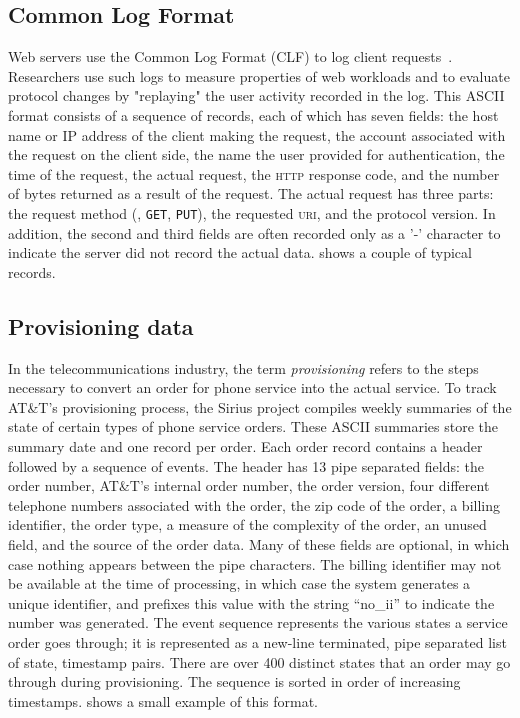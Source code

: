 \documentclass{sig-alternate}
\newcommand{\dibbler}{Sirius}
\begin{document}
\subsection{Common Log Format}
Web servers use the Common Log Format (CLF) to log client
requests~\cite{wpp}.  Researchers use such logs to measure
properties of web workloads and to evaluate protocol changes
by "replaying" the user activity recorded in the log.
This ASCII format consists of a sequence of
records, each of which has seven fields: the host name or IP address
of the client making the request, the account associated with the
request on the client side, the name the user provided for
authentication, the time of the request, the actual request, the
\textsc{http} response code, and the number of bytes returned as a
result of the request.  The actual request has three parts: the
request method (\eg, \texttt{GET}, \texttt{PUT}), the requested
\textsc{uri}, and the protocol version.  In addition, the second and
third fields are often recorded only as a '-' character to indicate
the server did not record the actual data.  
shows a couple of typical records.


\subsection{Provisioning data}
In the telecommunications industry, the term \textit{provisioning} refers to the steps necessary to convert an order for phone service into the actual 
service.  
To track AT\&T's provisioning process, the \dibbler{} project compiles
weekly summaries of the state of certain types of phone service orders.  
These ASCII summaries store the summary date and one record per order.
Each order record contains a header followed by a sequence of events.
The header has 13 pipe separated fields: the order number, AT\&T's
internal order number, the order version, four different telephone
numbers associated with the order, the zip code of the order, a
billing identifier, the order type, a measure of the complexity of the
order, an unused field, and the source of the order data.  Many of
these fields are optional, in which case nothing appears between the
pipe characters.  The billing identifier may not be available at the
time of processing, in which case the system generates a unique
identifier, and prefixes this value with the string ``no\_ii'' to
indicate the number was generated. The event sequence represents the
various states a service order goes through; it is represented as a
new-line terminated, pipe separated list of state, timestamp pairs.
There are over 400 distinct states that an order may go through during
provisioning.  The sequence is sorted in order of increasing timestamps.  shows a small example of
this format.
\end{document}
